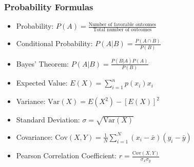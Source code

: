 \documentclass[english, threecolumn]{latex4ei/latex4ei_sheet}
\begin{document}
\begin{sectionbox}
\subsubsection{Probability Formulas}
\begin{itemize}
    \item Probability: \( P(A) = \frac{\text{Number of favorable outcomes}}{\text{Total number of outcomes}} \)
    \item Conditional Probability: \( P(A|B) = \frac{P(A \cap B)}{P(B)} \)
    \item Bayes' Theorem: \( P(A|B) = \frac{P(B|A)P(A)}{P(B)} \)
\end{itemize}
\vspace{\baselineskip}
\begin{itemize}
    \item Expected Value: \( E(X) = \sum_{i=1}^{n} p(x_i) x_i \)
    \item Variance: \( \text{Var}(X) = E(X^2) - [E(X)]^2 \)
    \item Standard Deviation: \( \sigma = \sqrt{\text{Var}(X)} \)
\end{itemize}
\vspace{\baselineskip}
\begin{itemize}
    \item Covariance: \( \text{Cov}(X, Y) = \frac{1}{N} \sum_{i=1}^{N} (x_i - \bar{x})(y_i - \bar{y}) \)
    \item Pearson Correlation Coefficient: \( r = \frac{\text{Cov}(X, Y)}{\sigma_x \sigma_y} \)
\end{itemize}
\end{sectionbox}
\end{document}
